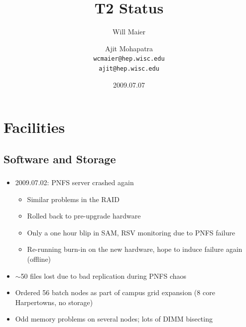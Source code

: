 \documentclass{beamer}
\title{T2 Status}
\author[Maier, Mohapatra]{
    Will Maier \and Ajit Mohapatra\\ 
    {\tt wcmaier@hep.wisc.edu}\\
    {\tt ajit@hep.wisc.edu}}
\institute[Wisconsin]{University of Wisconsin - High Energy Physics}
\date{2009.07.07}
\newcommand{\ca}{\ensuremath{\sim}}
\begin{document}
\begin{frame}
    \titlepage
\end{frame}


\section{Facilities}
\subsection{Software and Storage}
\begin{frame}
\frametitle{}
\begin{itemize}
	\item 2009.07.02: PNFS server crashed again
	\begin{itemize}
		\item Similar problems in the RAID
		\item Rolled back to pre-upgrade hardware
		\item Only a one hour blip in SAM, RSV monitoring due to PNFS failure
		\item Re-running burn-in on the new hardware, hope to induce failure again (offline)
	\end{itemize}
	\item \ca{}50 files lost due to bad replication during PNFS chaos
	\item Ordered 56 batch nodes as part of campus grid expansion (8 core Harpertowns, no storage)
	\item Odd memory problems on several nodes; lots of DIMM bisecting
\end{itemize}

\end{frame}
\end{document}
